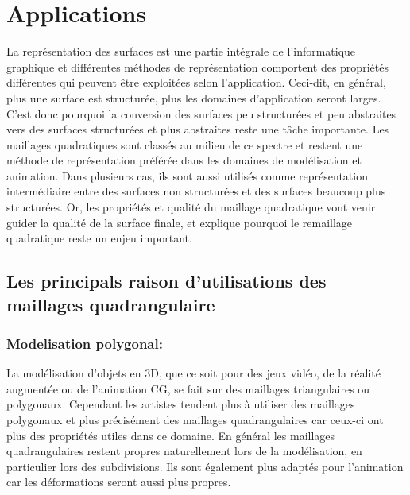 \documentclass[runningheads]{llncs}
\begin{document}
\section{Applications}
La représentation des surfaces est une partie intégrale de l’informatique graphique et différentes méthodes de représentation comportent des propriétés différentes qui peuvent être exploitées selon l’application. Ceci-dit, en général, plus une surface est structurée, plus les domaines d’application seront larges. C’est donc pourquoi la conversion des surfaces peu structurées et peu abstraites vers des surfaces structurées et plus abstraites reste une tâche importante. Les maillages quadratiques sont classés au milieu de ce spectre et restent une méthode de représentation préférée dans les domaines de modélisation et animation. Dans plusieurs cas, ils sont aussi utilisés comme représentation intermédiaire entre des surfaces non structurées et des surfaces beaucoup plus structurées. Or, les propriétés et qualité du maillage quadratique vont venir guider la qualité de la surface finale, et explique pourquoi le remaillage quadratique reste un enjeu important.

\subsection{Les principals raison d'utilisations des maillages quadrangulaire}


\subsubsection{Modelisation polygonal:}
La modélisation d’objets en 3D, que ce soit pour des jeux vidéo, de la réalité augmentée ou de l’animation CG, se fait sur des maillages triangulaires ou polygonaux. Cependant les artistes tendent plus à utiliser des maillages polygonaux et plus précisément des maillages quadrangulaires car ceux-ci ont plus des propriétés utiles dans ce domaine. En général les maillages quadrangulaires restent propres naturellement lors de la modélisation, en particulier lors des subdivisions. Ils sont également plus adaptés pour l’animation car les déformations seront aussi plus propres.
\end{document}
